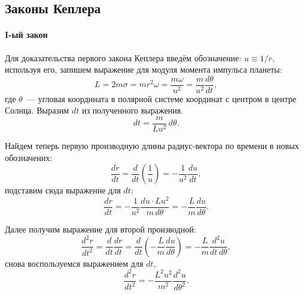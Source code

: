 \subsection{Законы Кеплера}
\paragraph{I-ый закон} 

Для доказательства первого закона Кеплера введём обозначение: $u \equiv 1/r$, используя его, запишем выражение для модуля момента импульса планеты:
\begin{equation*}
	L = 2 m \sigma = m r^2 \omega = \frac{m \omega}{u^2} = \frac{m}{u^2} \frac{d \theta}{d t},
\end{equation*}
где $\theta$~--- угловая координата в полярной системе координат с центром в центре Солнца.
Выразим $dt$ из полученного выражения.
\begin{equation*}
	dt = \frac{m}{L u^2} \,d \theta.
\end{equation*}

Найдем теперь первую производную длины радиус-вектора по времени в новых обозначених:
\begin{equation*}
	\frac{d r}{d t} = \frac{d}{d t} \left( \frac{1}{u} \right) = - \frac{1}{u^2} \frac{du}{dt},
\end{equation*}
подставим сюда выражение для $dt$:
\begin{equation*}
	\frac{d r}{d t} = - \frac{1}{u^2} \frac{du \cdot L u^2}{m \,d \theta} = - \frac{L}{m} \frac{d u}{d \theta}.
\end{equation*}

Далее получим выражение для второй производной:
\begin{equation*}
	\frac{d^2 r}{dt^2} = \frac{d}{dt} \frac{d r}{d t} = \frac{d}{dt} \left( - \frac{L}{m} \frac{d u}{d \theta} \right) = -\frac{L}{m} \frac{d^2 u}{dt \,d \theta},
\end{equation*}
снова воспользуемся выражением для $dt$,
\begin{equation*}
	\frac{d^2 r}{dt^2} = - \frac{L^2	 u^2}{m^2} \frac{d^2 u}{d \theta^2}.
\end{equation*}

